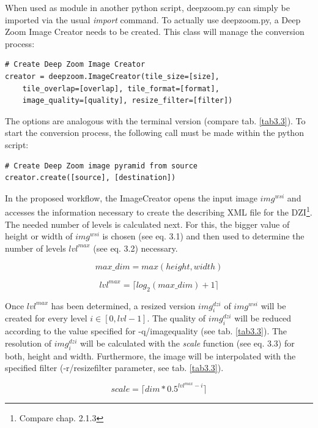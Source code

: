 When used as module in another python script, deepzoom.py can simply be imported via the usual \emph{import} command. To actually use deepzoom.py, a Deep Zoom Image Creator needs to be created. This class will manage the conversion process:

\begin{lstlisting}[frame=single]
# Create Deep Zoom Image Creator
creator = deepzoom.ImageCreator(tile_size=[size], 
	tile_overlap=[overlap],	tile_format=[format], 
	image_quality=[quality], resize_filter=[filter])
\end{lstlisting}

The options are analogous with the terminal version (compare tab. \ref{tab3.3}). To start the conversion process, the following call must be made within the python script:

\begin{lstlisting}[frame=single]
# Create Deep Zoom image pyramid from source
creator.create([source], [destination])
\end{lstlisting}

In the proposed workflow, the ImageCreator opens the input image $img^{wsi}$ and accesses the information necessary to create the describing XML file for the DZI\footnote{Compare chap. 2.1.3}. The needed number of levels is calculated next. For this, the bigger value of height or width of $img^{wsi}$ is chosen (see eq. 3.1) and then used to determine the number of levels $lvl^{max}$ (see eq. 3.2) necessary.

\begin{equation}
	max{\_}dim = max(height, width)
\end{equation}

\begin{equation}
	lvl^{max} = {\lceil}log_2(max{\_}dim) + 1\rceil
\end{equation}

Once $lvl^{max}$ has been determined, a resized version $img^{dzi}_i$ of $img^{wsi}$ will be created for every level $i \in [0, lvl-1]$. The quality of $img^{dzi}_i$ will be reduced according to the value specified for -q/image{\textunderscore}quality (see tab. \ref{tab3.3}). The resolution of $img^{dzi}_i$ will be calculated with the \emph{scale} function (see eq. 3.3) for both, height and width. Furthermore, the image will be interpolated with the specified filter (-r/resize{\textunderscore}filter parameter, see tab. \ref{tab3.3}).

\begin{equation}
	scale = {\lceil}dim * 0.5^{lvl^{max}-i}\rceil
\end{equation}

